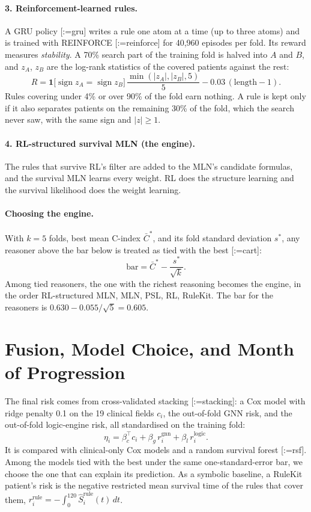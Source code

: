 \documentclass{mnnit}
\makeatletter
\newcommand{\rc}[1]{[\def\rc@sep{}\@for\rc@key:=#1\do{\rc@sep\ref{ref:\rc@key}\def\rc@sep{, }}]}
\makeatother
\begin{document}
\paragraph{3. Reinforcement-learned rules.} A GRU policy \rc{gru} writes a rule one atom at a time (up to three atoms) and
is trained with REINFORCE \rc{reinforce} for 40,960 episodes per fold. Its reward measures \emph{stability}. A 70\% search
part of the training fold is halved into $A$ and $B$, and $z_A$, $z_B$ are the log-rank statistics of the covered
patients against the rest:
\begin{equation}
  R=\mathbf{1}\big[\operatorname{sign}z_A=\operatorname{sign}z_B\big]\,\frac{\min(|z_A|,|z_B|,5)}{5}-0.03\,(\text{length}-1).
\end{equation}
Rules covering under 4\% or over 90\% of the fold earn nothing. A rule is kept only if it also separates patients on the
remaining 30\% of the fold, which the search never saw, with the same sign and $|z|\ge1$.

\paragraph{4. RL-structured survival MLN (the engine).} The rules that survive RL's filter are added to the MLN's
candidate formulas, and the survival MLN learns every weight. RL does the structure learning and the survival
likelihood does the weight learning.

\paragraph{Choosing the engine.} With $k=5$ folds, best mean C-index $\bar C^*$, and its fold standard deviation $s^*$,
any reasoner above the bar below is treated as tied with the best \rc{cart}:
\begin{equation}
  \text{bar}=\bar C^*-\frac{s^*}{\sqrt{k}}.
\end{equation}
Among tied reasoners, the one with the richest reasoning becomes the engine, in the order RL-structured MLN, MLN, PSL,
RL, RuleKit. The bar for the reasoners is $0.630-0.055/\sqrt5=0.605$.

\section{Fusion, Model Choice, and Month of Progression}
The final risk comes from cross-validated stacking \rc{stacking}: a Cox model with ridge penalty 0.1 on the 19 clinical
fields $c_i$, the out-of-fold GNN risk, and the out-of-fold logic-engine risk, all standardised on the training fold:
\begin{equation}
  \eta_i=\beta_c^\top c_i+\beta_g\,r^{\text{gnn}}_i+\beta_l\,r^{\text{logic}}_i.
\end{equation}
It is compared with clinical-only Cox models and a random survival forest \rc{rsf}. Among the models tied with the best
under the same one-standard-error bar, we choose the one that can explain its prediction. As a symbolic baseline, a
RuleKit patient's risk is the negative restricted mean survival time of the rules that cover them,
$r^{\text{rule}}_i=-\int_0^{120}\hat S^{\text{rule}}_i(t)\,dt$.
\end{document}
